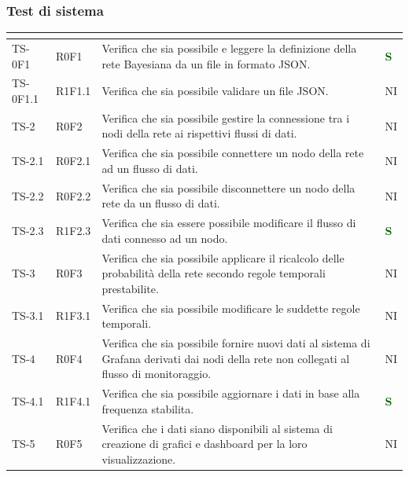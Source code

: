 \subsubsection{Test di sistema}
\begin{longtable}{|C{2.5cm}|C{2.5cm}|C{6.5cm}|C{1.5cm}|}
			\hline
			\textbf{\color{title_text}{Test}} & \textbf{\color{title_text}{Requisito}} & \textbf{\color{title_text}{Descrizione}} & \textbf{\color{title_text}{Stato}} \\
			\hline
			\endhead
			{TS-0F1} & {R0F1} & Verifica che sia possibile e leggere la
			definizione della rete Bayesiana da un
			file in formato JSON.  & \textcolor{darkgreen}{\textbf{S}}\\
			\hline
			{TS-0F1.1} & {R1F1.1} & Verifica che sia possibile validare un
			file JSON. & {NI}\\
			\hline
			{TS-2} & {R0F2} & Verifica che sia possibile gestire la
			connessione tra i nodi della rete ai
			rispettivi flussi di dati. & {NI}\\
			\hline
			{TS-2.1} & {R0F2.1} & Verifica che sia possibile connettere un
			nodo della rete ad un flusso di dati. & {NI}\\
			\hline
			{TS-2.2} & {R0F2.2} & Verifica che sia possibile disconnettere un
			nodo della rete da un flusso di dati. & {NI}\\
			\hline
			{TS-2.3} & {R1F2.3} & Verifica che sia essere possibile modificare il
			flusso di dati connesso ad un nodo. & \textcolor{darkgreen}{\textbf{S}}\\
			\hline
			{TS-3} & {R0F3} & Verifica che sia possibile applicare il
			ricalcolo delle probabilità della rete
			secondo regole temporali prestabilite. & {NI}\\
			\hline
			{TS-3.1} & {R1F3.1} & Verifica che sia possibile modificare le
			suddette regole temporali. & {NI}\\
			\hline
			{TS-4} & {R0F4} & Verifica che sia possibile fornire nuovi dati
			al sistema di Grafana derivati dai nodi
			della rete non collegati al flusso di
			monitoraggio. & {NI}\\
			\hline
			{TS-4.1} & {R1F4.1} & Verifica che sia possibile aggiornare i dati
			in base alla frequenza stabilita. & \textcolor{darkgreen}{\textbf{S}}\\
			\hline
			{TS-5} & {R0F5} & Verifica che i dati siano disponibili al sistema di
			creazione di grafici e dashboard per la
			loro visualizzazione. & {NI}\\
			\hline

\end{longtable}
